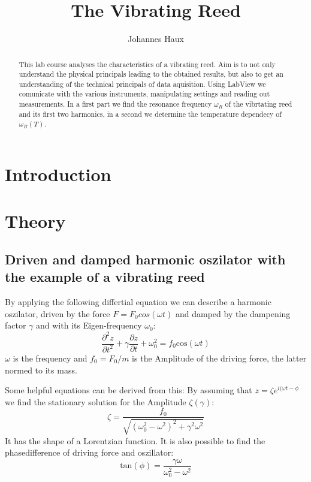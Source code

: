 \documentclass[a4paper,12pt]{article}
\title{The Vibrating Reed}
\author{Johannes Haux}
\begin{document}
\maketitle

\begin{abstract}
This lab course analyses the characteristics of a vibrating reed. Aim is to not only understand the physical principals leading to the obtained results, but also to get an understanding of the technical principals of data aquisition. Using LabView we comunicate with the various instruments, manipulating settings and reading out measurements. 
In a first part we find the resonance frequency $\omega_R$ of the vibrtating reed and its first two harmonics, in a second we determine the temperature dependecy of $\omega_R(T)$.
\end{abstract}

\section{Introduction}
\label{sec:intro}

\section{Theory}
\label{sec:theo}


\subsection{Driven and damped harmonic oszilator with the example of a vibrating reed}
\label{sec:osz}
By applying the following differtial equation we can describe a harmonic oszilator, driven by the force $F = F_0 cos(\omega t)$ and damped by the dampening factor $\gamma$ and with its Eigen-frequency $\omega_0$:
\begin{equation}
 \frac{\partial^2z}{\partial t^2} + \gamma \frac{\partial z}{\partial t} + \omega_0^2 = f_0 \mathrm{cos}(\omega t)
 \label{eq:stAmp}
\end{equation}
$\omega$ is the frequency and $f_0 = F_0/m$ is the Amplitude of the driving force, the latter normed to its mass. 

Some helpful equations can be derived from this:
By assuming that $z = \zeta e^{i(\omega t - \phi}$ we find the stationary solution for the Amplitude $\zeta (\gamma)$:
\begin{equation}
 \zeta = \frac{f_0}{\sqrt{(\omega_0^2 - \omega^2)^2 + \gamma^2\omega^2}}
\end{equation}
It has the shape of a Lorentzian function.
It is also possible to find the phasedifference of driving force and oszillator:
\begin{equation}
 \mathrm{tan}(\phi) = \frac{\gamma\omega}{\omega_0^2 - \omega^2}
\end{equation}
\end{document}
